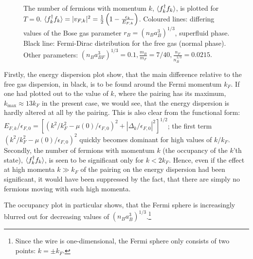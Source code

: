 \begin{figure} 
\begin{center}  
  
\caption{The number of fermions with momentum $k$, $\braket{f_k^\dagger f_k}$, is plotted for $T = 0$. $\braket{f_k^\dagger f_k} = |v_{F,k}|^2 = \frac{1}{2}\left(1 - \frac{\epsilon_k}{E_{F,k}}\right)$. Coloured lines: differing values of the Bose gas parameter $r_B = (n_Ba_B^3)^{1/3}$, superfluid phase. Black line: Fermi-Dirac distribution for the free gas (normal phase). Other parameters: $(n_Ba_{BF}^3)^{1/3} = 0.1, \frac{m_B}{m_F} = 7/40, \frac{n_F}{n_B^{1/3}} = 0.0215.$  }  
\label{fig.Occupancy}  
\end{center}    
\end{figure}

Firstly, the energy dispersion plot show, that the main difference relative to the free gas dispersion, in black, is to be found around the Fermi momentum $k_F$. If one had plotted out to the value of $k$, where the pairing has its maximum, $k_{\max} \approx 13 k_F$ in the present case, we would see, that the energy dispersion is hardly altered at all by the pairing. This is also clear from the functional form: $E_{F,k}/\epsilon_{F,0} = [(k^2/k_F^2 - \mu(0)/\epsilon_{F,0})^2 + |\Delta_k/\epsilon_{F,0}|^2 ]^{1/2}$; the first term $(k^2/k_F^2 - \mu(0)/\epsilon_{F,0})^2$ quickly becomes dominant for high values of $k/k_F$. Secondly, the number of fermions with momentum $k$ (the occupancy of the $k$'th state), $\braket{f_k^\dagger f_k}$, is seen to be significant only for $k < 2k_F$. Hence, even if the effect at high momenta $k \gg k_F$ of the pairing on the energy dispersion had been significant, it would have been suppressed by the fact, that there are simply no fermions moving with such high momenta.

The occupancy plot in particular shows, that the Fermi sphere is increasingly blurred out for decreasing values of $(n_Ba_B^3)^{1/3}$.\footnote{Since the wire is one-dimensional, the Fermi sphere only consists of two points: $k = \pm k_F$.} 

